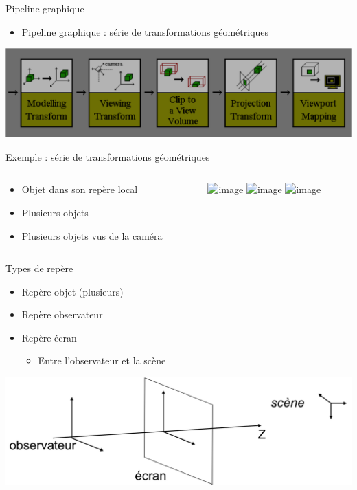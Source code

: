 \begin{frame}{Pipeline graphique}
\begin{itemize}
\item Pipeline graphique : série de transformations géométriques
\end{itemize}
\begin{center}
\includegraphics[width=.8\textwidth]{figs/pipeline.png}
\end{center}
\end{frame}

\begin{frame}{Exemple : série de transformations géométriques}
\begin{columns}
\begin{column}{.6\textwidth}
\begin{itemize}
\item<1-3> Objet dans son repère local
\item<2-3> Plusieurs objets
\item<3> Plusieurs objets vus de la caméra
\end{itemize}
\end{column}
\begin{column}{.39\textwidth}
\includegraphics<1>[width=.8\textwidth]{figs/pp1.png}
\includegraphics<2>[width=.8\textwidth]{figs/pp2.png}
\includegraphics<3>[width=.8\textwidth]{figs/pp3.png}

\end{column}
\end{columns}
\end{frame}

\begin{frame}{Types de repère}
\begin{itemize}
\item Repère objet (plusieurs)
\item Repère observateur
\item Repère écran
\begin{itemize}
\item Entre l'observateur et la scène
\end{itemize}
\end{itemize}
\begin{center}
\includegraphics[width=.8\textwidth]{figs/reperes.png}
\end{center}
\end{frame}

